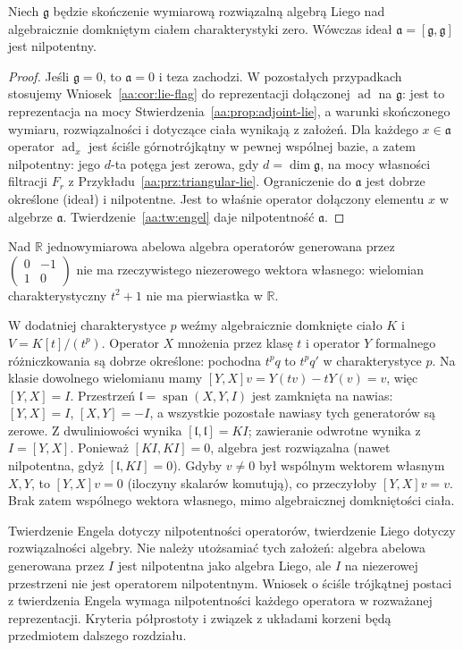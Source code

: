 \newpage
\begin{wniosek}
\label{aa:cor:lie-derived-nilpotent}
Niech $\mathfrak g$ będzie skończenie wymiarową
rozwiązalną algebrą Liego nad algebraicznie domkniętym
ciałem charakterystyki zero. Wówczas ideał
$\mathfrak a=[\mathfrak g,\mathfrak g]$ jest nilpotentny.
\end{wniosek}
\begin{proof}
Jeśli $\mathfrak g=0$, to $\mathfrak a=0$ i teza zachodzi.
W pozostałych przypadkach stosujemy
Wniosek~\ref{aa:cor:lie-flag} do reprezentacji
dołączonej $\operatorname{ad}$ na $\mathfrak g$:
jest to reprezentacja na mocy
Stwierdzenia~\ref{aa:prop:adjoint-lie}, a warunki
skończonego wymiaru, rozwiązalności i dotyczące
ciała wynikają z założeń.
Dla każdego $x\in\mathfrak a$ operator $\operatorname{ad}_x$
jest ściśle górnotrójkątny w pewnej wspólnej bazie,
a zatem nilpotentny: jego $d$-ta potęga jest zerowa,
gdy $d=\dim\mathfrak g$, na mocy własności filtracji
$F_r$ z Przykładu~\ref{aa:prz:triangular-lie}.
Ograniczenie do $\mathfrak a$ jest dobrze określone
(ideał) i nilpotentne. Jest to właśnie operator
dołączony elementu $x$ w algebrze $\mathfrak a$.
Twierdzenie~\ref{aa:tw:engel} daje nilpotentność
$\mathfrak a$.
\end{proof}

\begin{przyklad}
\label{aa:prz:lie-hypotheses}
Nad $\mathbb R$ jednowymiarowa abelowa algebra
operatorów generowana przez
$\begin{pmatrix}0&-1\\1&0\end{pmatrix}$
nie ma rzeczywistego niezerowego wektora własnego:
wielomian charakterystyczny $t^2+1$ nie ma pierwiastka
w $\mathbb R$.

W dodatniej charakterystyce $p$ weźmy algebraicznie
domknięte ciało $K$ i $V=K[t]/(t^p)$.
Operator $X$ mnożenia przez klasę $t$ i operator
$Y$ formalnego różniczkowania są dobrze określone:
pochodna $t^pq$ to $t^pq'$ w charakterystyce $p$.
Na klasie dowolnego wielomianu mamy
$[Y,X]v=Y(tv)-tY(v)=v$, więc $[Y,X]=I$.
Przestrzeń $\mathfrak l=\operatorname{span}(X,Y,I)$
jest zamknięta na nawias: $[Y,X]=I$, $[X,Y]=-I$,
a wszystkie pozostałe nawiasy tych generatorów
są zerowe. Z dwuliniowości wynika
$[\mathfrak l,\mathfrak l]=KI$; zawieranie odwrotne
wynika z $I=[Y,X]$. Ponieważ $[KI,KI]=0$,
algebra jest rozwiązalna (nawet nilpotentna, gdyż
$[\mathfrak l,KI]=0$).
Gdyby $v\ne0$ był wspólnym wektorem własnym $X,Y$,
to $[Y,X]v=0$ (iloczyny skalarów komutują),
co przeczyłoby $[Y,X]v=v$.
Brak zatem wspólnego wektora własnego, mimo
algebraicznej domkniętości ciała.
\end{przyklad}

Twierdzenie Engela dotyczy nilpotentności operatorów,
twierdzenie Liego dotyczy rozwiązalności algebry.
Nie należy utożsamiać tych założeń: algebra abelowa
generowana przez $I$ jest nilpotentna jako algebra
Liego, ale $I$ na niezerowej przestrzeni nie jest
operatorem nilpotentnym. Wniosek o ściśle trójkątnej
postaci z twierdzenia Engela wymaga nilpotentności
każdego operatora w rozważanej reprezentacji.
Kryteria półprostoty i związek z układami korzeni
będą przedmiotem dalszego rozdziału.
